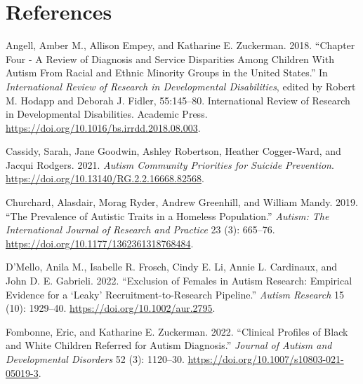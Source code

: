 \documentclass[
  letterpaper,
  DIV=11,
  numbers=noendperiod]{scrreprt}
\newlength{\cslhangindent}
\newlength{\cslentryspacingunit} %
\newenvironment{CSLReferences}[2] %
 {%
  \setlength{\parindent}{0pt}
  \ifodd #1
  \let\oldpar\par
  \def\par{\hangindent=\cslhangindent\oldpar}
  \fi
  \setlength{\parskip}{#2\cslentryspacingunit}
 }%
 {}
\begin{document}
\hypertarget{section-5}{%
\chapter{}\label{section-5}}


\hypertarget{sec-references}{%
\chapter{References}\label{sec-references}}

\hypertarget{refs}{}
\begin{CSLReferences}{1}{0}
\leavevmode{}%
Angell, Amber M., Allison Empey, and Katharine E. Zuckerman. 2018.
{``Chapter {Four} - {A Review} of {Diagnosis} and {Service Disparities
Among Children With Autism From Racial} and {Ethnic Minority Groups} in
the {United States}.''} In \emph{International {Review} of {Research} in
{Developmental Disabilities}}, edited by Robert M. Hodapp and Deborah J.
Fidler, 55:145--80. International {Review} of {Research} in
{Developmental Disabilities}. Academic Press.
\url{https://doi.org/10.1016/bs.irrdd.2018.08.003}.

\leavevmode{}%
Cassidy, Sarah, Jane Goodwin, Ashley Robertson, Heather Cogger-Ward, and
Jacqui Rodgers. 2021. \emph{Autism Community Priorities for Suicide
Prevention}. \url{https://doi.org/10.13140/RG.2.2.16668.82568}.

\leavevmode{}%
Churchard, Alasdair, Morag Ryder, Andrew Greenhill, and William Mandy.
2019. {``The Prevalence of Autistic Traits in a Homeless Population.''}
\emph{Autism: The International Journal of Research and Practice} 23
(3): 665--76. \url{https://doi.org/10.1177/1362361318768484}.

\leavevmode{}%
D'Mello, Anila M., Isabelle R. Frosch, Cindy E. Li, Annie L. Cardinaux,
and John D. E. Gabrieli. 2022. {``Exclusion of Females in Autism
Research: {Empirical} Evidence for a {`Leaky'} Recruitment-to-Research
Pipeline.''} \emph{Autism Research} 15 (10): 1929--40.
\url{https://doi.org/10.1002/aur.2795}.

\leavevmode{}%
Fombonne, Eric, and Katharine E. Zuckerman. 2022. {``Clinical {Profiles}
of {Black} and {White Children Referred} for {Autism Diagnosis}.''}
\emph{Journal of Autism and Developmental Disorders} 52 (3): 1120--30.
\url{https://doi.org/10.1007/s10803-021-05019-3}.


\end{CSLReferences}
\end{document}
